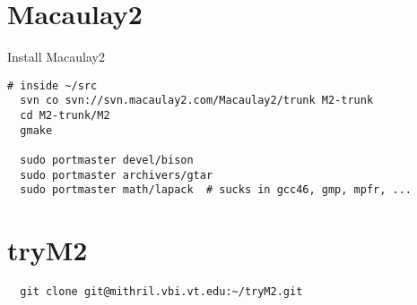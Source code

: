 \documentclass[a4paper]{article}
\begin{document}
\section{Macaulay2}
Install Macaulay2

\begin{verbatim}
# inside ~/src
  svn co svn://svn.macaulay2.com/Macaulay2/trunk M2-trunk
  cd M2-trunk/M2
  gmake

  sudo portmaster devel/bison
  sudo portmaster archivers/gtar
  sudo portmaster math/lapack  # sucks in gcc46, gmp, mpfr, ...
\end{verbatim}

\section{tryM2}
\begin{verbatim}
  git clone git@mithril.vbi.vt.edu:~/tryM2.git
\end{verbatim}
\end{document}
